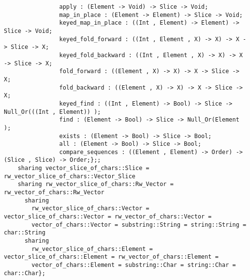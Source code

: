 \begin{verbatim}
                apply : (Element -> Void) -> Slice -> Void;
                map_in_place : (Element -> Element) -> Slice -> Void;
                keyed_map_in_place : ((Int , Element) -> Element) -> Slice -> Void;
                keyed_fold_forward : ((Int , Element , X) -> X) -> X -> Slice -> X;
                keyed_fold_backward : ((Int , Element , X) -> X) -> X -> Slice -> X;
                fold_forward : ((Element , X) -> X) -> X -> Slice -> X;
                fold_backward : ((Element , X) -> X) -> X -> Slice -> X;
                keyed_find : ((Int , Element) -> Bool) -> Slice -> Null_Or(((Int , Element)) );
                find : (Element -> Bool) -> Slice -> Null_Or(Element );
                exists : (Element -> Bool) -> Slice -> Bool;
                all : (Element -> Bool) -> Slice -> Bool;
                compare_sequences : ((Element , Element) -> Order) -> (Slice , Slice) -> Order;};;
    sharing vector_slice_of_chars::Slice = rw_vector_slice_of_chars::Vector_Slice
    sharing rw_vector_slice_of_chars::Rw_Vector = rw_vector_of_chars::Rw_Vector
      sharing
        rw_vector_slice_of_chars::Vector = vector_slice_of_chars::Vector = rw_vector_of_chars::Vector =
        vector_of_chars::Vector = substring::String = string::String = char::String
      sharing
        rw_vector_slice_of_chars::Element = vector_slice_of_chars::Element = rw_vector_of_chars::Element =
        vector_of_chars::Element = substring::Char = string::Char = char::Char};
\end{verbatim}
\index[fun]{\_[]:=}
\index[fun]{\_[]}

